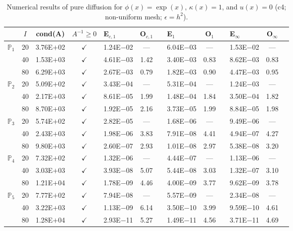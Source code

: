\begin{table}[H]
\centering
\caption{Numerical results of pure diffusion for $\phi(x)=\exp(x)$, $\kappa(x)=1$, and $u(x)=0$ (c4; non-uniform mesh; $\epsilon=h^2$).}
\begin{tabular}{@{}l c c c l c c l c c l c c@{}}
\toprule
 & $I$ & cond(A) & $A^{-1}\geq 0$ &  E$_{c,1}$ & O$_{c,1}$ && E$_1$ & O$_1$ && E$_{\infty}$ & O$_{\infty}$\\
\midrule
\multirow{3}{*}{$\mathbb{P}_{1}$}
 & 20 & 3.76E$+$02 & $\checkmark$ & 1.24E$-$02 & --- && 6.04E$-$03 & --- && 1.53E$-$02 & ---\\
 & 40 & 1.53E$+$03 & $\checkmark$ & 4.61E$-$03 & 1.42 && 3.40E$-$03 & 0.83 && 8.62E$-$03 & 0.83\\
 & 80 & 6.29E$+$03 & $\checkmark$ & 2.67E$-$03 & 0.79 && 1.82E$-$03 & 0.90 && 4.47E$-$03 & 0.95\\
\midrule
\multirow{3}{*}{$\mathbb{P}_{2}$}
 & 20 & 5.09E$+$02 & $\checkmark$ & 3.43E$-$04 & --- && 5.31E$-$04 & --- && 1.24E$-$03 & ---\\
 & 40 & 2.17E$+$03 & $\checkmark$ & 8.61E$-$05 & 1.99 && 1.48E$-$04 & 1.84 && 3.50E$-$04 & 1.82\\
 & 80 & 8.70E$+$03 & $\checkmark$ & 1.92E$-$05 & 2.16 && 3.73E$-$05 & 1.99 && 8.84E$-$05 & 1.98\\
\midrule
\multirow{3}{*}{$\mathbb{P}_{3}$}
 & 20 & 5.74E$+$02 & $\checkmark$ & 2.82E$-$05 & --- && 1.68E$-$06 & --- && 9.49E$-$06 & ---\\
 & 40 & 2.43E$+$03 & $\checkmark$ & 1.98E$-$06 & 3.83 && 7.91E$-$08 & 4.41 && 4.94E$-$07 & 4.27\\
 & 80 & 9.80E$+$03 & $\checkmark$ & 2.60E$-$07 & 2.93 && 1.01E$-$08 & 2.97 && 5.38E$-$08 & 3.20\\
\midrule
\multirow{3}{*}{$\mathbb{P}_{4}$}
 & 20 & 7.32E$+$02 & $\checkmark$ & 1.32E$-$06 & --- && 4.44E$-$07 & --- && 1.13E$-$06 & ---\\
 & 40 & 3.03E$+$03 & $\checkmark$ & 3.93E$-$08 & 5.07 && 5.44E$-$08 & 3.03 && 1.32E$-$07 & 3.10\\
 & 80 & 1.21E$+$04 & $\checkmark$ & 1.78E$-$09 & 4.46 && 4.00E$-$09 & 3.77 && 9.62E$-$09 & 3.78\\
\midrule
\multirow{3}{*}{$\mathbb{P}_{5}$}
 & 20 & 7.77E$+$02 & $\checkmark$ & 7.94E$-$08 & --- && 5.57E$-$09 & --- && 2.34E$-$08 & ---\\
 & 40 & 3.22E$+$03 & $\checkmark$ & 1.13E$-$09 & 6.14 && 3.50E$-$10 & 3.99 && 9.59E$-$10 & 4.61\\
 & 80 & 1.28E$+$04 & $\checkmark$ & 2.93E$-$11 & 5.27 && 1.49E$-$11 & 4.56 && 3.71E$-$11 & 4.69\\
\bottomrule
\end{tabular}
\end{table}